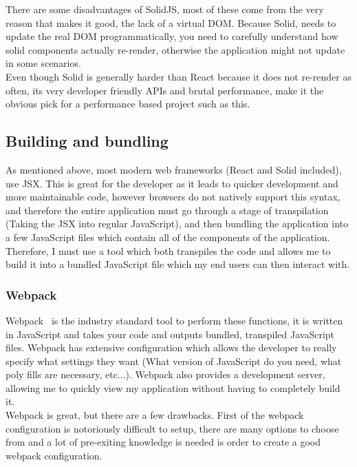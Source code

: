 \documentclass[titlepage]{article}
\begin{document}
There are some disadvantages of SolidJS, most of these come from the very reason that makes it good, the lack of a virtual DOM. Because Solid, needs to update the real DOM programmatically, you need to carefully understand how solid components actually re-render, otherwise the application might not update in some scenarios. \\

Even though Solid is generally harder than React because it does not re-render as often, its very developer friendly APIs and brutal performance, make it the obvious pick for a performance based project such as this.

\subsection{Building and bundling}
As mentioned above, most modern web frameworks (React and Solid included), use JSX. This is great for the developer as it leads to quicker development and more maintainable code, however browsers do not natively support this syntax, and therefore the entire application must go through a stage of transpilation (Taking the JSX into regular JavaScript), and then bundling the application into a few JavaScript files which contain all of the components of the application. Therefore, I must use a tool which both transpiles the code and allows me to build it into a bundled JavaScript file which my end users can then interact with.

\subsubsection{Webpack}
Webpack~\cite{webpack} is the industry standard tool to perform these functions, it is written in JavaScript and takes your code and outputs bundled, transpiled JavaScript files. Webpack has extensive configuration which allows the developer to really specify what settings they want (What version of JavaScript do you need, what poly fills are necessary, etc...). Webpack also provides a development server, allowing me to quickly view my application without having to completely build it. \\

Webpack is great, but there are a few drawbacks. First of the webpack configuration is notoriously difficult to setup, there are many options to choose from and a lot of pre-exiting knowledge is needed is order to create a good webpack configuration. \\
\end{document}

